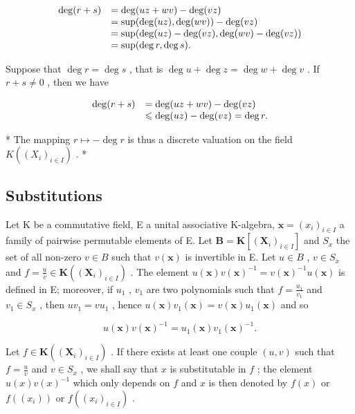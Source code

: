 \[
\begin{array}{r l} \deg (r + s) & = \deg (u z + w v) - \deg (v z) \\ & = \sup (\deg (u z), \deg (w v)) - \deg (v z) \\ & = \sup (\deg (u z) - \deg (v z), \deg (w v) - \deg (v z)) \\ & = \sup (\deg r, \deg s). \end{array}
\]

Suppose that \(\deg r = \deg s\) , that is \(\deg u + \deg z = \deg w + \deg v\) . If \(r + s \neq 0\) , then we have

\[
\begin{array}{r l} \deg (r + s) & = \deg (u z + w v) - \deg (v z) \\ & \leqslant \deg (u z) - \deg (v z) = \deg r. \end{array}
\]

* The mapping \(r \mapsto -\deg r\) is thus a discrete valuation on the field \(K((X_i)_{i \in I})\) . *

\subsection{Substitutions}

Let K be a commutative field, E a unital associative K-algebra, \(\mathbf{x} = (x_i)_{i \in I}\) a family of pairwise permutable elements of E. Let \(\mathbf{B} = \mathbf{K}[(\mathbf{X}_i)_{i \in I}]\) and \(S_x\) the set of all non-zero \(v \in B\) such that \(v(\mathbf{x})\) is invertible in E. Let \(u \in B\) , \(v \in S_x\) and \(f = \frac{u}{v} \in \mathbf{K}((\mathbf{X}_i)_{i \in I})\) . The element \(u(\mathbf{x}) v(\mathbf{x})^{-1} = v(\mathbf{x})^{-1} u(\mathbf{x})\) is defined in E; moreover, if \(u_1\) , \(v_1\) are two polynomials such that \(f = \frac{u_1}{v_1}\) and \(v_1 \in S_x\) , then \(uv_1 = vu_1\) , hence \(u(\mathbf{x}) v_1(\mathbf{x}) = v(\mathbf{x}) u_1(\mathbf{x})\) and so

\[
u (\mathbf {x}) v (\mathbf {x}) ^ {- 1} = u _ {1} (\mathbf {x}) v _ {1} (\mathbf {x}) ^ {- 1}.
\]

Let \(f \in \mathbf{K}((\mathbf{X}_i)_{i \in I})\) . If there exists at least one couple \((u, v)\) such that \(f = \frac{u}{v}\) and \(v \in S_x\) , we shall say that \(x\) is substitutable in \(f\) ; the element \(u(x) v(x)^{-1}\) which only depends on \(f\) and \(x\) is then denoted by \(f(x)\) or \(f((x_i))\) or \(f((x_i)_{i \in I})\) .


